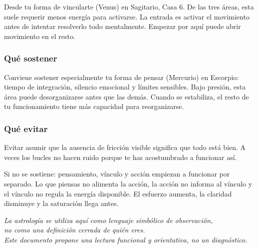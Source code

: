 \documentclass[11pt,a4paper]{article}
\begin{document}
\justifying
Desde tu forma de vincularte (Venus) en Sagitario, Casa 6. De las tres áreas, esta suele requerir menos energía para activarse. La entrada es activar el movimiento antes de intentar resolverlo todo mentalmente. Empezar por aquí puede abrir movimiento en el resto.

\subsubsection*{Qué sostener}

\justifying
Conviene sostener especialmente tu forma de pensar (Mercurio) en Escorpio: tiempo de integración, silencio emocional y límites sensibles. Bajo presión, esta área puede desorganizarse antes que las demás. Cuando se estabiliza, el resto de tu funcionamiento tiene más capacidad para reorganizarse.

\subsubsection*{Qué evitar}

\justifying
Evitar asumir que la ausencia de fricción visible significa que todo está bien. A veces los bucles no hacen ruido porque te has acostumbrado a funcionar así.

\vspace{0.6cm}

\justifying
Si no se sostiene: pensamiento, vínculo y acción empiezan a funcionar por separado. Lo que piensas no alimenta la acción, la acción no informa al vínculo y el vínculo no regula la energía disponible. El esfuerzo aumenta, la claridad disminuye y la saturación llega antes.

\vspace{1.2cm}

\begin{center}
{\small\itshape\color{grisai}
La astrología se utiliza aquí como lenguaje simbólico de observación,\\
no como una definición cerrada de quién eres.\\[0.2cm]
Este documento propone una lectura funcional y orientativa, no un diagnóstico.
}
\end{center}
\end{document}
